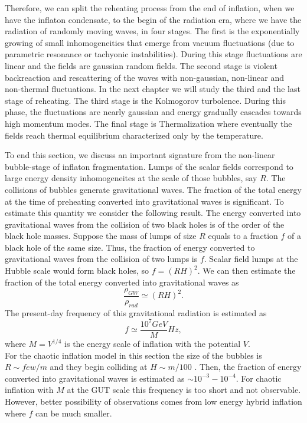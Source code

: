 \documentclass[11pt,a4paper,twoside]{book}
\begin{document}
Therefore, we can split the reheating process from the end of inflation, when we have the inflaton condensate, to the begin of the radiation era, where we have the radiation of randomly moving waves, in four stages. The first is the exponentially growing of small inhomogeneities that emerge from vacuum fluctuations (due to parametric resonance or tachyonic instabilities). During this stage fluctuations are linear and the fields are gaussian random fields. The second stage is violent backreaction and rescattering of the waves with non-gaussian, non-linear and non-thermal fluctuations. In the next chapter we will study the third and the last stage of reheating. The third stage is the Kolmogorov turbolence. During this phase, the fluctuations are nearly gaussian and energy gradually cascades towards high momentum modes. The final stage is Thermalization where eventually the fields reach thermal equilibrium characterized only by the temperature.

To end this section, we discuss an important signature from the non-linear bubble-stage of inflaton fragmentation. Lumps of the scalar fields correspond to large energy density inhomogeneites at the scale of those bubbles, say $ R $. The collisions of bubbles generate gravitational waves. The fraction of the total energy at the time of preheating converted into gravitational waves is significant. To estimate this quantity we consider the following result. The energy converted into gravitational waves from the collision of two black holes is of the order of the black hole masses. Suppose the mass of lumps of size $ R $ equals to a fraction $ f $ of a black hole of the same size.
Thus, the fraction of energy converted to gravitational waves from the collision of two lumps is $ f $. Scalar field lumps at the Hubble scale would form black holes, so $ f = (RH)^{2} $. We can then estimate the fraction of the total energy  converted into gravitational waves as
\begin{equation}
\label{Chap5:fractionTotalEnergyGW}
\frac{\rho_{GW}}{\rho_{rad}} \simeq (RH)^{2}.
\end{equation}
The present-day frequency of this gravitational radiation is  estimated as 
\begin{equation}
\label{Chap5:frequencyGW}
f\simeq \frac{10^{7} GeV}{M} Hz,
\end{equation}
where $ M=V^{1/4} $ is the energy scale of inflation with the potential $ V $.\\
For the chaotic inflation model in this section the size of the bubbles is $ R\sim few/m $ and they begin colliding at $ H\sim m/100 $ \cite{Chap5:Fragmentation}. Then, the fraction of energy converted into gravitational waves is estimated as $\sim 10^{-3}-10^{-4}$. For chaotic inflation with $ M  $ at the GUT scale this frequency is too short and not observable. However, better possibility of observations comes from low energy hybrid inflation where $ f $ can be much smaller. 
\end{document}
